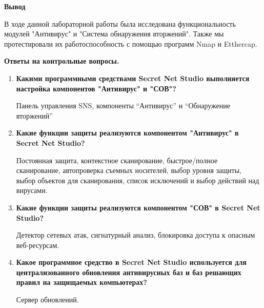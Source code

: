 \documentclass[a4paper,14pt]{extarticle}
\begin{document}
    \textbf{Вывод}\par
    В ходе данной лабораторной работы была исследована функциональность модулей "Антивирус" и "Система обнаружения вторжений". 
    Также мы протестировали их работоспособность с помощью программ Nmap и Etthercap.

    \textbf{Ответы на контрольные вопросы.}
    \begin{enumerate}
        \singlespacing
        \item \textbf{Какими программными средствами Secret Net Studio выполняется настройка компонентов "Антивирус" и "СОВ"?}\par
        Панель управления SNS, компоненты “Антивирус” и “Обнаружение вторжений”
        \item \textbf{Какие функции защиты реализуются компонентом "Антивирус" в Secret Net Studio?}\par
        Постоянная защита, контекстное сканирование, быстрое/полное сканирование, автопроверка съемных носителей, выбор уровня защиты, выбор объектов для сканирования, список исключений и выбор действий над вирусами.
        \item \textbf{Какие функции защиты реализуются компонентом "СОВ" в Secret Net Studio?}\par
        Детектор сетевых атак, сигнатурный анализ, блокировка доступа к опасным веб-ресурсам.
        \item \textbf{Какое программное средство в Secret Net Studio используется для централизованного обновления антивирусных баз и баз решающих правил на защищаемых компьютерах?}\par
        Сервер обновлений.
    \end{enumerate}
\end{document}
